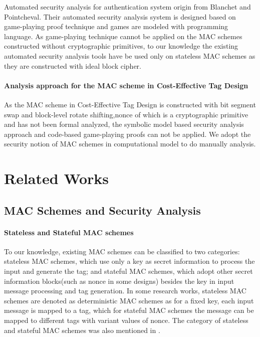 \documentclass{article}
\begin{document}
Automated security analysis for authentication system origin from Blanchet and
Pointcheval\cite{blanchet2006automated}. Their automated security analysis system is designed based on
game-playing proof technique and games are modeled with programming language. As
game-playing technique cannot be applied on the MAC schemes constructed without
cryptographic primitives, to our knowledge the existing automated security analysis tools have be used only
on stateless MAC schemes as they are constructed with ideal block cipher.   
\paragraph{Analysis approach for the MAC scheme in Cost-Effective Tag Design}
As the MAC scheme in Cost-Effective Tag Design is constructed with bit segment
swap and block-level rotate shifting,nonce of which is a cryptographic primitive
and has not been formal analyzed, the symbolic model based security analysis
approach and code-based game-playing proofs can not be applied. We adopt the
security notion of MAC schemes in computational model to do manually analysis.

\section{Related Works} 
\subsection{MAC Schemes and Security Analysis}
\paragraph{Stateless and Stateful MAC schemes}
To our knowledge, existing MAC schemes can be classified to two categories:
stateless MAC schemes, which use only a key as secret information to process the
input and generate the tag; and stateful MAC schemes, which adopt other secret
information blocks(such as nonce in some designs) besides the key in input message
processing and tag generation. In some research works, stateless MAC schemes are denoted as deterministic MAC schemes as for a fixed key, each input message is mapped to a tag, which for stateful MAC schemes the message can be mapped to different tags with variant values of nonce.
The category of stateless and stateful MAC schemes was also mentioned in \cite{xor-mac}.

\end{document}
